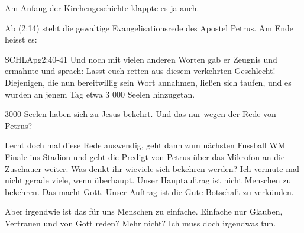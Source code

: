 \documentclass[fontsize=16pt]{mybib}
\begin{document}
    Am Anfang der Kirchengeschichte klappte es ja auch.
\begin{otsblock}
    Ab (2:14) steht die gewaltige Evangelisationsrede des Apostel Petrus. Am Ende heisst es:
    \begin{bibelbox}{SCHL}{Apg}{2:40-41}
        Und noch mit vielen anderen Worten gab er Zeugnis und ermahnte und sprach: Lasst euch retten aus diesem verkehrten Geschlecht! Diejenigen, die nun bereitwillig sein Wort annahmen, ließen sich taufen, und es wurden an jenem Tag etwa 3 000 Seelen hinzugetan.
    \end{bibelbox} 
    3000 Seelen haben sich zu Jesus bekehrt. Und das nur wegen der Rede von Petrus?
    
    Lernt doch mal diese Rede auswendig, geht dann zum nächsten Fussball WM Finale ins Stadion und gebt die Predigt von Petrus über das Mikrofon an die Zuschauer weiter. Was denkt ihr wieviele sich bekehren werden? Ich vermute mal nicht gerade viele, wenn überhaupt. Unser Hauptauftrag ist nicht Menschen zu bekehren. Das macht Gott. Unser Auftrag ist die Gute Botschaft zu verkünden.
\end{otsblock}
\begin{otsblock}
    Aber irgendwie ist das für uns Menschen zu einfache. Einfache nur Glauben, Vertrauen und von Gott reden? Mehr nicht? Ich muss doch irgendwas tun.
\end{otsblock}
\end{document}
